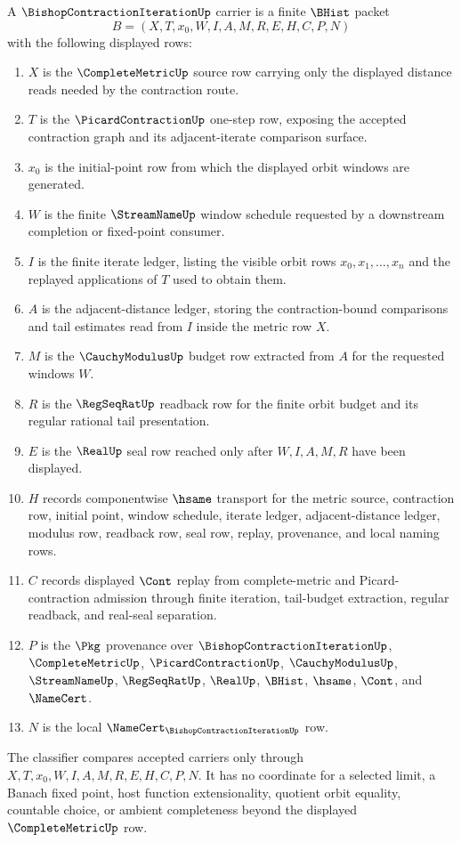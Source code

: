 \begin{definition}\label{def:bishop-contraction-iteration-carrier}
A $\BishopContractionIterationUp$ carrier is a finite $\BHist$ packet
$$
B=(X,T,x_0,W,I,A,M,R,E,H,C,P,N)
$$
with the following displayed rows:
\begin{enumerate}
\item $X$ is the $\CompleteMetricUp$ source row carrying only the displayed distance reads needed by the contraction route.
\item $T$ is the $\PicardContractionUp$ one-step row, exposing the accepted contraction graph and its adjacent-iterate comparison surface.
\item $x_0$ is the initial-point row from which the displayed orbit windows are generated.
\item $W$ is the finite $\StreamNameUp$ window schedule requested by a downstream completion or fixed-point consumer.
\item $I$ is the finite iterate ledger, listing the visible orbit rows $x_0,x_1,\ldots,x_n$ and the replayed applications of $T$ used to obtain them.
\item $A$ is the adjacent-distance ledger, storing the contraction-bound comparisons and tail estimates read from $I$ inside the metric row $X$.
\item $M$ is the $\CauchyModulusUp$ budget row extracted from $A$ for the requested windows $W$.
\item $R$ is the $\RegSeqRatUp$ readback row for the finite orbit budget and its regular rational tail presentation.
\item $E$ is the $\RealUp$ seal row reached only after $W,I,A,M,R$ have been displayed.
\item $H$ records componentwise $\hsame$ transport for the metric source, contraction row, initial point, window schedule, iterate ledger, adjacent-distance ledger, modulus row, readback row, seal row, replay, provenance, and local naming rows.
\item $C$ records displayed $\Cont$ replay from complete-metric and Picard-contraction admission through finite iteration, tail-budget extraction, regular readback, and real-seal separation.
\item $P$ is the $\Pkg$ provenance over $\BishopContractionIterationUp$, $\CompleteMetricUp$, $\PicardContractionUp$, $\CauchyModulusUp$, $\StreamNameUp$, $\RegSeqRatUp$, $\RealUp$, $\BHist$, $\hsame$, $\Cont$, and $\NameCert$.
\item $N$ is the local $\NameCert_{\BishopContractionIterationUp}$ row.
\end{enumerate}
The classifier compares accepted carriers only through $X,T,x_0,W,I,A,M,R,E,H,C,P,N$. It has no coordinate for a selected limit, a Banach fixed point, host function extensionality, quotient orbit equality, countable choice, or ambient completeness beyond the displayed $\CompleteMetricUp$ row.
\end{definition}

